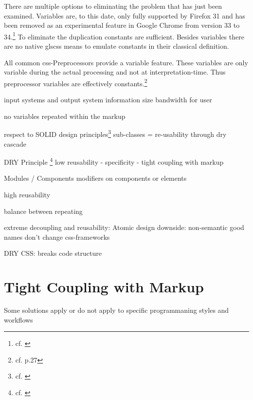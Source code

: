 There are multiple options to eliminating the problem that has just been examined.
Variables are, to this date, only fully supported by Firefox 31 and has been removed as an experimental feature in Google Chrome from version 33 to 34.\footnote{cf. \cite{cssvariables}}
To eliminate the duplication constants are sufficient.
Besides variables there are no native gls{css} means to emulate constants in their classical definition.

All common \gls{css}-Preprocessors provide a variable feature.
These variables are only variable during the actual processing and not at interpretation-time.
Thus preprocessor variables are effectively constants.\footnote{cf. \cite{wirthpreprocessors} p.27}

input systems and output system
information size
bandwidth for user



no variables
repeated within the markup

respect to SOLID design principles\footnote{cf. \cite{solidcss}}
sub-classes = re-usability through dry
cascade

DRY Principle \footnote{cf. \cite{pragmaticprogrammer}}
low reusability
- specificity
- tight coupling with markup

Modules / Components
modifiers on components or elements

high reusability

balance between repeating 

extreme decoupling and reusability: Atomic design
downside: non-semantic
good names don't change
css-frameworks

DRY CSS: breaks code structure

\section{Tight Coupling with Markup}
Some solutions apply or do not apply to specific programmaning styles and workflows

